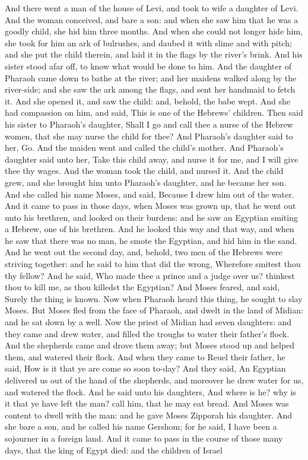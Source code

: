And there went a man of the house of Levi, and took to wife a daughter of Levi. And the woman conceived, and bare a son: and when she saw him that he was a goodly child, she hid him three months. And when she could not longer hide him, she took for him an ark of bulrushes, and daubed it with slime and with pitch; and she put the child therein, and laid it in the flags by the river’s brink. And his sister stood afar off, to know what would be done to him. And the daughter of Pharaoh came down to bathe at the river; and her maidens walked along by the river-side; and she saw the ark among the flags, and sent her handmaid to fetch it. And she opened it, and saw the child: and, behold, the babe wept. And she had compassion on him, and said, This is one of the Hebrews’ children. Then said his sister to Pharaoh’s daughter, Shall I go and call thee a nurse of the Hebrew women, that she may nurse the child for thee? And Pharaoh’s daughter said to her, Go. And the maiden went and called the child’s mother. And Pharaoh’s daughter said unto her, Take this child away, and nurse it for me, and I will give thee thy wages. And the woman took the child, and nursed it. And the child grew, and she brought him unto Pharaoh’s daughter, and he became her son. And she called his name Moses, and said, Because I drew him out of the water.  And it came to pass in those days, when Moses was grown up, that he went out unto his brethren, and looked on their burdens: and he saw an Egyptian smiting a Hebrew, one of his brethren. And he looked this way and that way, and when he saw that there was no man, he smote the Egyptian, and hid him in the sand. And he went out the second day, and, behold, two men of the Hebrews were striving together: and he said to him that did the wrong, Wherefore smitest thou thy fellow? And he said, Who made thee a prince and a judge over us? thinkest thou to kill me, as thou killedst the Egyptian? And Moses feared, and said, Surely the thing is known. Now when Pharaoh heard this thing, he sought to slay Moses. But Moses fled from the face of Pharaoh, and dwelt in the land of Midian: and he sat down by a well.  Now the priest of Midian had seven daughters: and they came and drew water, and filled the troughs to water their father’s flock. And the shepherds came and drove them away; but Moses stood up and helped them, and watered their flock. And when they came to Reuel their father, he said, How is it that ye are come so soon to-day? And they said, An Egyptian delivered us out of the hand of the shepherds, and moreover he drew water for us, and watered the flock. And he said unto his daughters, And where is he? why is it that ye have left the man? call him, that he may eat bread. And Moses was content to dwell with the man: and he gave Moses Zipporah his daughter. And she bare a son, and he called his name Gershom; for he said, I have been a sojourner in a foreign land.  And it came to pass in the course of those many days, that the king of Egypt died: and the children of Israel 